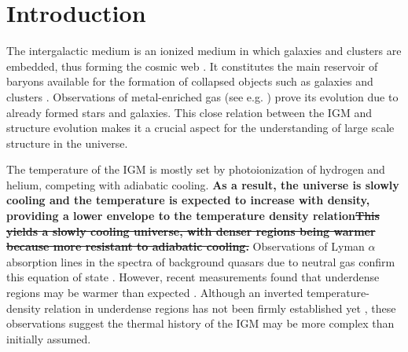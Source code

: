 \documentclass[twocolumns]{emulateapj}
\newcommand\Cc[1]{{\color{blue} \bf #1}} %
\begin{document}
\section{Introduction}
The intergalactic medium is an ionized medium in which galaxies and clusters are embedded, thus forming the cosmic web \citep{1996Natur.380..603B}. It constitutes the main reservoir of baryons available for the formation of collapsed objects such as galaxies and clusters \citep{1997ApJ...489....7R}. Observations of metal-enriched gas (see e.g. \citet{2009A&A...493..409S,2010MNRAS.407.2063W}) prove its evolution due to already formed stars and galaxies. This close relation between the IGM and structure evolution makes it a  crucial aspect for the understanding of large scale structure in the universe.

The temperature of the IGM is mostly set by photoionization of hydrogen  and helium, competing with adiabatic cooling. \Cc{As a result, the universe is slowly cooling and the temperature is expected to increase with density, providing a lower envelope to the temperature density relation\sout{This yields a slowly cooling universe, with denser regions being warmer because more resistant to adiabatic cooling.}} Observations of Lyman $\alpha$ absorption lines in the spectra of background quasars due to neutral gas confirm this equation of state \citep{2000MNRAS.318..817S,2000ApJ...534...41R,2012ApJ...757L..30R}. However, recent measurements found that underdense regions may be warmer than expected \citep{2009MNRAS.399L..39V,2008MNRAS.386.1131B,2014MNRAS.441.1916B}. Although an inverted temperature-density relation in underdense regions has not been firmly established yet \citep{2014MNRAS.438.2499B}, these observations suggest the thermal history of the IGM may be more complex than initially assumed.
\end{document}
